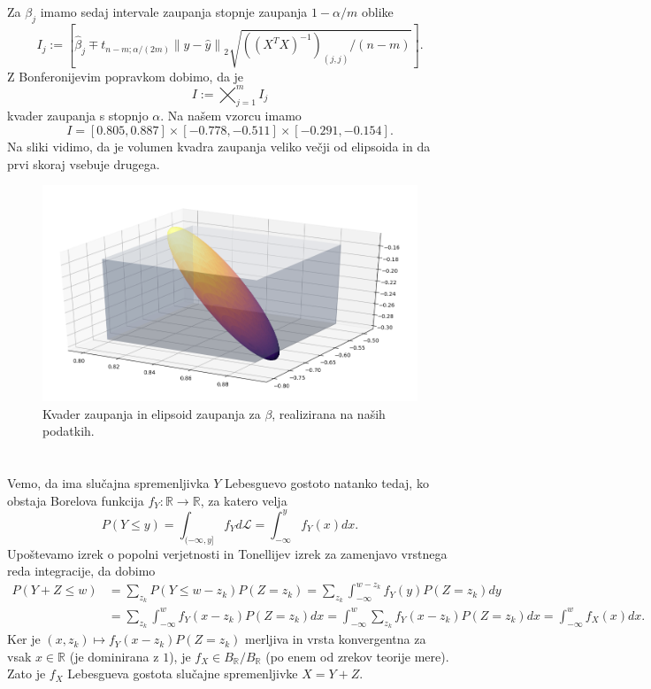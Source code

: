 \documentclass[ letterpaper, titlepage, fleqn]{article}
\newcommand{\R}{\mathbb R}
\newcommand{\LL}{\mathscr L}
\newcommand{\norm}[1]{\left\lVert#1\right\rVert}
\begin{document}
\subsubsection{}
Za $\beta_j$ imamo sedaj intervale zaupanja stopnje zaupanja $1 - \alpha / m$ oblike
$$I_j := \left[\hat{\beta}_j \mp t_{n-m;\alpha/(2m)} \norm{y - \hat{y}}_2 \sqrt{((X^TX)^{-1})_{(j,j)} / (n-m)}\right].$$
Z Bonferonijevim popravkom dobimo, da je
$$I := \bigtimes_{j=1}^m I_j$$
kvader zaupanja s stopnjo $\alpha$. Na našem vzorcu imamo
$$I = [0.805, 0.887] \times [-0.778, -0.511] \times [-0.291, -0.154].$$
Na sliki vidimo, da je volumen kvadra zaupanja veliko večji od elipsoida in da prvi skoraj vsebuje drugega.
\begin{center}
\begin{figure}[h]
\includegraphics[width=16cm]{graphics/ConfidenceElipsoidVsCuboid1.png}
\caption{Kvader zaupanja in elipsoid zaupanja za $\beta$, realizirana na naših podatkih.}
\end{figure}
\end{center}

\section{}
\subsection{}
Vemo, da ima slučajna spremenljivka $Y$ Lebesguevo gostoto natanko tedaj, ko obstaja Borelova funkcija $f_Y \colon \R \to \R$, za katero velja
$$P(Y \leq y) = \int_{(-\infty, y]} f_Y d\LL = \int_{-\infty}^y f_Y(x) dx.$$
Upoštevamo izrek o popolni verjetnosti in Tonellijev izrek za zamenjavo vrstnega reda integracije, da dobimo
\begin{equation*}
\begin{aligned}
P(Y + Z \leq w) &= \sum_{z_k} P(Y \leq w - z_k) P(Z = z_k) = \sum_{z_k} \int_{-\infty}^{w-z_k} f_Y(y) P(Z = z_k) dy \\
&= \sum_{z_k} \int_{-\infty}^w f_Y(x - z_k) P(Z = z_k) dx = \int_{-\infty}^w \sum_{z_k} f_Y(x-z_k) P(Z = z_k) dx = \int_{-\infty}^w f_X(x) dx.
\end{aligned}
\end{equation*}
Ker je $(x,z_k) \mapsto f_Y(x - z_k) P(Z = z_k)$ merljiva in vrsta konvergentna za vsak $x\in\R$ (je dominirana z $1$), je $f_X \in B_\R / B_\R$ (po enem od zrekov teorije mere). Zato je $f_X$ Lebesgueva gostota slučajne spremenljivke $X = Y + Z$.
\end{document}

